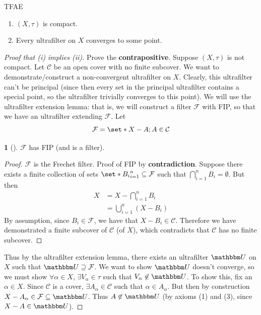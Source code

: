 \documentclass[11pt]{article}
\numberwithin{equation}{section}
\newcounter{theo}[section]\setcounter{theo}{0}
\theoremstyle{definition}
\newtheorem{claim}{\color{ForestGreen}{\textbf{Claim}}}[section]
\theoremstyle{definition}
\def\Set{\set*}%
\def\sse{\subseteq}
\newcommand{\1}{\mathbbm 1}
\def\t{\tau}
\newcommand{\UU}{\mathbbm U}
\newcommand{\cC}{\mathcal C}
\newcommand{\fF}{\mathcal F}
\begin{document}
\begin{theorem}[]
	TFAE
	\begin{enumerate}
		\item $(X,\t)$ is compact.
		\item Every ultrafilter on $X$ converges to some point. 
	\end{enumerate}
\end{theorem}

\begin{proof}[Proof that (i) implies (ii)]
	Prove the \textbf{contrapositive}. Suppose $(X,\t)$ is not compact. Let $\cC$ be an open cover with no finite subcover. We want to demonstrate/construct a non-convergent ultrafilter on $X$. Clearly, this ultrafilter can't be principal (since then every set in the principal ultrafilter contains a special point, so the ultrafilter trivially converges to this point). We will use the ultrafilter extension lemma: that is, we will construct a filter $\fF$ with FIP, so that we have an ultrafilter extending $\fF$. Let
	\begin{equation}
		\fF = \Set{X - A; A \in \cC}
	\end{equation}

	\begin{claim}[]
		$\fF$ has FIP (and is a filter). 
	\end{claim}
	\begin{proof}
		$\fF$ is the Frechet filter. Proof of FIP by \textbf{contradiction}. Suppose there exists a finite collection of sets $\Set{B_i}_{i=1}^n \sse \fF$ such that $\bigcap_{i=1}^n B_i = \emptyset$. But then
		\begin{align*}
			X &= X - \bigcap_{i=1}^n B_i \\
			&= \bigcup_{i=1}^n (X - B_i)
		\end{align*}
		By assumption, since $B_i \in \fF$, we have that $X - B_i \in \cC$. Therefore we have demonstrated a finite subcover of $\cC$ (of $X$), which contradicts that $\cC$ has no finite subcover.  
	\end{proof}

	Thus by the ultrafilter extension lemma, there exists an ultrafilter $\UU$ on $X$ such that $\UU \supseteq \fF$. We want to show $\UU$ doesn't converge, so we must show $\forall \alpha \in X$, $\exists V_\alpha \in \t$ such that $V_\alpha \not\in \UU$. To show this, fix an $\alpha \in X$. Since $\cC$ is a cover, $\exists A_\alpha \in \cC$ such that $\alpha \in A_\alpha$. But then by construction $X - A_\alpha \in \fF \sse \UU$. Thus $A \not\in \UU$ (by axioms (1) and (3), since $X - A \in \UU$). 
			
\end{proof}
\end{document}
